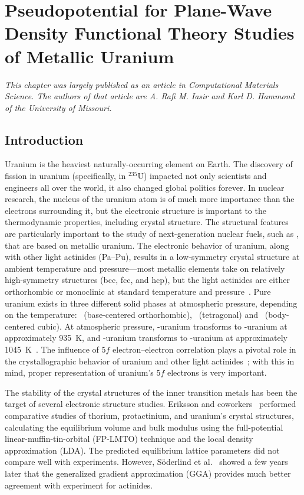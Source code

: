 \chapter{Pseudopotential for Plane-Wave Density Functional Theory Studies of Metallic Uranium}
\textit{This chapter was largely published as an article in \textup{Computational Materials \mbox{Science}}. The authors of that article are A. Rafi M. Iasir and Karl D. Hammond of the University of Missouri.}

\section{Introduction}\label{sec_intro}
Uranium is the heaviest naturally-occurring element on Earth. The discovery of
fission in uranium (specifically, in $^{235}$U) impacted not only scientists
and engineers all over the world, it also changed global politics forever. In
nuclear research, the nucleus of the uranium atom is of much more importance
than the electrons surrounding it, but the electronic structure is important
to the thermodynamic properties, including crystal structure. The structural
features are particularly important to the study of next-generation nuclear
fuels, such as , that are based on metallic uranium.
The electronic behavior of uranium, along with other light actinides (Pa--Pu),
results in a low-symmetry crystal structure at ambient temperature and
pressure---most metallic elements take on relatively high-symmetry structures
(bcc, fcc, and hcp), but the light actinides are either orthorhombic or
monoclinic at standard temperature and pressure~\cite{Soderlind1995}.
Pure uranium exists in three different solid phases at atmospheric pressure,
depending on the temperature:
\textalpha\ (base-centered orthorhombic), \textbeta\ (tetragonal) and
\textgamma\ (body-centered cubic). At atmospheric pressure, \textalpha-uranium
transforms to \textbeta-uranium at approximately 935~K, and \textbeta-uranium transforms to
\textgamma-uranium at approximately
1045~K~\cite{lawson1988structure,akella1997structural}.
The influence of $5f$
electron--electron correlation plays a pivotal role in the crystallographic
behavior of uranium and other light
actinides~\cite{lander2003gh,freemanHandbook1984}; with this in mind, proper
representation of uranium's $5f$ electrons is very important.

The stability of the crystal structures of the inner transition metals has been
the target of several electronic structure studies.
Eriksson and coworkers~\cite{wills1992crystal,eriksson1993first} performed
comparative studies of thorium, protactinium, and uranium's crystal
structures, calculating the equilibrium volume and bulk modulus using the
full-potential linear-muffin-tin-orbital (FP-LMTO) technique and the local
density approximation (LDA)\@.
The predicted equilibrium lattice parameters did not compare well with
experiments.
However, S\"oderlind et al.~\cite{soderlind1994electronic} showed a few years
later that the generalized gradient approximation (GGA) provides much better
agreement with experiment for actinides.

